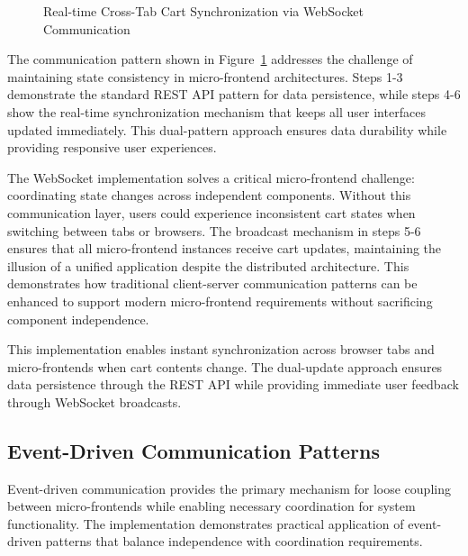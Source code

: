 \documentclass[12pt,a4paper]{report}
\begin{document}
\begin{figure}[htbp]
{
}
\caption{Real-time Cross-Tab Cart Synchronization via WebSocket Communication}
\label{fig:websocket-implementation}
\end{figure}

The communication pattern shown in Figure~\ref{fig:websocket-implementation} addresses the challenge of maintaining state consistency in micro-frontend architectures. Steps 1-3 demonstrate the standard REST API pattern for data persistence, while steps 4-6 show the real-time synchronization mechanism that keeps all user interfaces updated immediately. This dual-pattern approach ensures data durability while providing responsive user experiences.

The WebSocket implementation solves a critical micro-frontend challenge: coordinating state changes across independent components. Without this communication layer, users could experience inconsistent cart states when switching between tabs or browsers. The broadcast mechanism in steps 5-6 ensures that all micro-frontend instances receive cart updates, maintaining the illusion of a unified application despite the distributed architecture. This demonstrates how traditional client-server communication patterns can be enhanced to support modern micro-frontend requirements without sacrificing component independence.

This implementation enables instant synchronization across browser tabs and micro-frontends when cart contents change. The dual-update approach ensures data persistence through the REST API while providing immediate user feedback through WebSocket broadcasts.

\subsection{Event-Driven Communication Patterns}

Event-driven communication provides the primary mechanism for loose coupling between micro-frontends while enabling necessary coordination for system functionality. The implementation demonstrates practical application of event-driven patterns that balance independence with coordination requirements.
\end{document}
